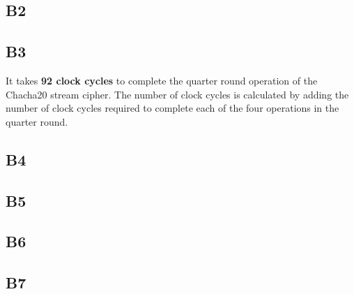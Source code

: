 \documentclass[12pt, letterpaper, titlepage, hidelinks]{article}
\begin{document}
	\subsection{B2}

	\subsection{B3}
		It takes \textbf{92 clock cycles} to complete the quarter round operation of the Chacha20 stream cipher. The number of clock cycles is calculated by adding the number of clock cycles required to complete each of the four operations in the quarter round.
	\subsection{B4}

	\subsection{B5}

	\subsection{B6}

	\subsection{B7}
\end{document}
